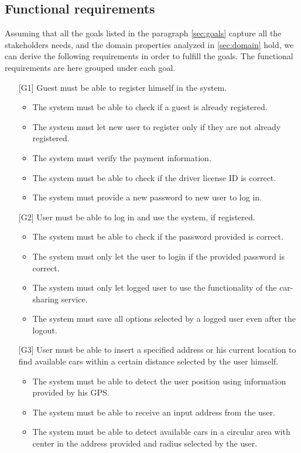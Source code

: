 \documentclass[10pt, a4paper,titlepage]{article}
\begin{document}
\subsection{Functional requirements}
Assuming that all the goals listed in the paragraph \ref{sec:goals} capture all the stakeholders needs, and the domain properties analyzed in \ref{sec:domain} hold, we can derive the following requirements in order to fulfill the goals.
The functional requirements are here grouped under each goal.
\begin{itemize}
\item [{[G1]}] Guest must be able to register himself in the system.
\begin{itemize}
\item The system must be able to check if a guest is already registered.
\item The system must let new user to register only if they are not already registered.
\item The system must verify the payment information.
\item The system must be able to check if the driver license ID is correct.
\item The system must provide a new password to new user to log in.
\end{itemize}
\item [{[G2]}] User must be able to log in and use the system, if registered.
\begin{itemize}
\item The system must be able to check if the password provided is correct.
\item The system must only let the user to login if the provided password is correct.
\item The system must only let logged user to use the functionality of the car-sharing service.
\item The system must save all options selected by a logged user even after the logout.
\end{itemize}
\item [{[G3]}] User must be able to insert a specified address or his current location to find available cars within a certain distance selected by the user himself.
\begin{itemize}
\item The system must be able to detect the user position using information provided by his GPS.
\item The system must be able to receive an input address from the user.
\item The system must be able to detect available cars in a circular area with center in the address provided and radius selected by the user.

\end{itemize}
\end{itemize}
\end{document}
